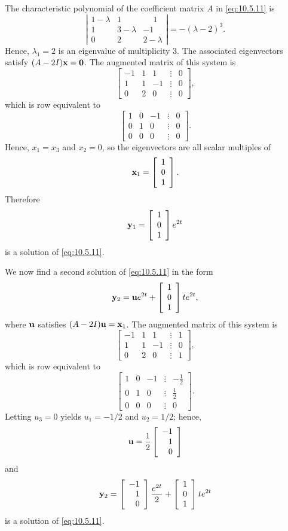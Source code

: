 \begin{examplesolution}
\solution The characteristic polynomial of the coefficient matrix $A$ in \eqref{eq:10.5.11} is
\[
  \left|
  \begin{array}{ccc}
    1-\lambda & 1         & \phantom{-}1 \\
    1         & 3-\lambda & -1           \\
    0         & 2         & 2-\lambda
  \end{array}\right|=-(\lambda-2)^{3}.
\]
Hence, $\lambda_{1}=2$ is an eigenvalue of multiplicity $3$. The associated eigenvectors satisfy
$(A-2I){\bf x}={\bf0}$. The augmented matrix of this system is
\[
  \left[
  \begin{array}{rrrcr}
    -1 & 1 & 1  & \vdots & 0 \\
    1  & 1 & -1 & \vdots & 0 \\
    0  & 2 & 0  & \vdots & 0
  \end{array}\right],
\]
which is row equivalent to
\[
  \left[
  \begin{array}{rrrcr}
    1 & 0 & -1 & \vdots & 0 \\
    0 & 1 & 0  & \vdots & 0 \\
    0 & 0 & 0  & \vdots & 0
  \end{array}\right].
\]
Hence, $x_{1}=x_{3}$ and $x_{2}=0$, so the eigenvectors are all scalar multiples of
\[
  {\bf x}_{1}=\left[\begin{array}{r}1\\0\\1\end{array}\right].
\]
Therefore
\[
  {\bf y}_{1}=\left[\begin{array}{r}1\\0\\1\end{array}\right]e^{2t}
\]
is a solution of \eqref{eq:10.5.11}.

We now find a second solution of \eqref{eq:10.5.11} in the form
\[
  {\bf y}_{2}={\bf u}e^{2t}+\left[\begin{array}{r}1\\0\\1\end{array}\right]te^{2t},
\]
where ${\bf u}$ satisfies $(A-2I){\bf u}={\bf x}_{1}$. The augmented matrix of this system is
\[
  \left[
  \begin{array}{rrrcr}
    -1 & 1 & 1  & \vdots & 1 \\
    1  & 1 & -1 & \vdots & 0 \\
    0  & 2 & 0  & \vdots & 1
  \end{array}\right],
\]
which is row equivalent to
\[
  \left[
  \begin{array}{rrrcr}
    1 & 0 & -1 & \vdots & -\frac{1}{2} \\
    0 & 1 & 0  & \vdots & \frac{1}{2}  \\
    0 & 0 & 0  & \vdots & 0
  \end{array}\right].
\]
Letting $u_{3}=0$ yields $u_{1}=-1/2$ and $u_{2}=1/2$; hence,
\[
  {\bf u}=\frac{1}{2}\left[\begin{array}{r}-1\\1\\0\end{array}\right]
\]
and
\[
  {\bf y}_{2}=\left[\begin{array}{r}-1\\1\\0\end{array}\right]{\frac{e^{2t}}{2}}+\left[\begin{array}{r}1\\0\\1\end{array}\right]te^{2t}
\]
is a solution of \eqref{eq:10.5.11}.


\end{examplesolution}
